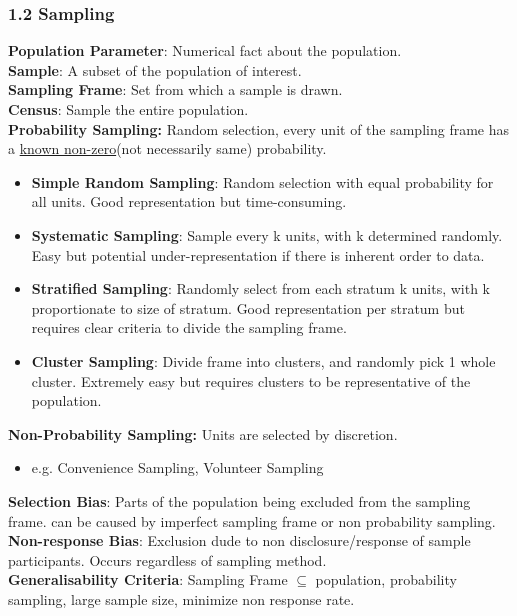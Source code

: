 \begin{multicols*}{3}
\subsubsection{1.2 Sampling}
\textbf{Population Parameter}: Numerical fact about the population.\\
\textbf{Sample}: A subset of the population of interest.\\
\textbf{Sampling Frame}: Set from which a sample is drawn.\\
\textbf{Census}: Sample the entire population.\\
\textbf{Probability Sampling:} Random selection, every unit of the sampling frame has a \underline{known non-zero}(not necessarily same) probability.
\begin{itemize}
    \item \textbf{Simple Random Sampling}: Random selection with equal probability for all units. Good representation but time-consuming.
    \item \textbf{Systematic Sampling}: Sample every k units, with k determined randomly. Easy but potential under-representation if there is inherent order to data.
    \item \textbf{Stratified Sampling}: Randomly select from each stratum k units, with k proportionate to size of stratum. Good representation per stratum but requires clear criteria to divide the sampling frame.
    \item \textbf{Cluster Sampling}: Divide frame into clusters, and randomly pick 1 whole cluster. Extremely easy but requires clusters to be representative of the population.
\end{itemize}
\textbf{Non-Probability Sampling:} Units are selected by discretion.
\begin{itemize}
    \item e.g. Convenience Sampling, Volunteer Sampling
\end{itemize}
\textbf{Selection Bias}: Parts of the population being excluded from the sampling frame. can be caused by imperfect sampling frame or non probability sampling.\\
\textbf{Non-response Bias}: Exclusion dude to non disclosure/response of sample participants. Occurs regardless of sampling method.\\
\textbf{Generalisability Criteria}: Sampling Frame $\subseteq $ population, probability sampling, large sample size, minimize non response rate.


\end{multicols*}
